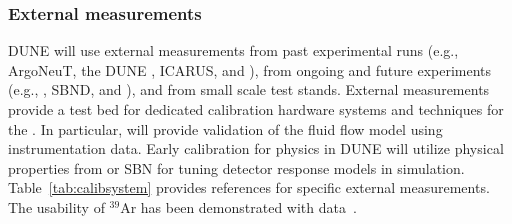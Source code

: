\subsubsection{External measurements} 
DUNE will use external measurements from past experimental runs (e.g., ArgoNeuT, the DUNE , ICARUS, and \lariat), from ongoing and future experiments (e.g., , SBND, and ), and from small scale  test stands. External measurements provide a test bed for dedicated calibration hardware systems and techniques for the . In particular,  will provide validation of the fluid flow model using instrumentation data. 
Early calibration for physics in DUNE will utilize \lar physical properties from  or SBN  for tuning detector response models in simulation. Table~\ref{tab:calibsystem} provides  references for specific external measurements. The usability of ${}^{39}$Ar has been demonstrated with \microboone data~\cite{MICROBOONE-NOTE-1050-PUB}. 
